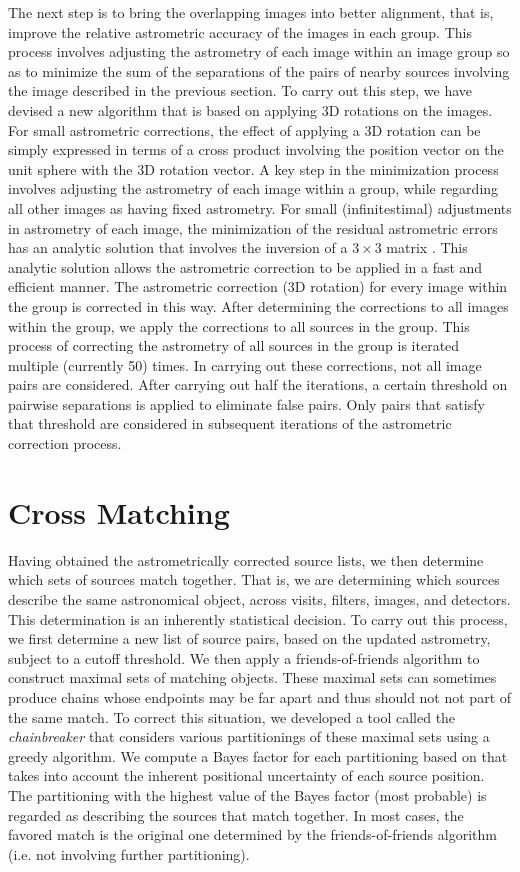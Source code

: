 The next step is to bring the overlapping images into better alignment, that is,
improve the relative astrometric accuracy of the images in each group.
This process involves adjusting the astrometry of each
image within an image group so as to  minimize the sum of the separations of the
pairs of nearby sources involving the image described in the previous section.
To carry out this step, we have devised a new algorithm that is based
on applying 3D rotations on the images. 
For small astrometric corrections,
the effect of applying a 3D rotation can be simply expressed in terms
of a cross product involving the position vector on the unit sphere
with the 3D rotation vector. A key step in the minimization process involves adjusting
the astrometry of
each image within a group, while regarding all other images as having fixed astrometry.
For small (infinitestimal) adjustments in astrometry of each image, the minimization of the residual astrometric errors
has an analytic solution
that involves the inversion of a $3 \times 3$ matrix \citep{2012arXiv1206.0644B}. This analytic solution allows the astrometric correction to be applied
 in a fast and efficient manner. The astrometric correction (3D rotation)
for every image within the group is corrected in this way. After determining the corrections
to all images within the group, we apply the corrections  to all
sources in the group. This process of correcting the astrometry of all sources in the group
is iterated multiple (currently 50) times.
In carrying out these corrections, not all image pairs are considered. After carrying out
half the iterations, a certain threshold on pairwise separations 
is applied
to eliminate false pairs. Only pairs that satisfy that threshold are considered in  subsequent
iterations of the astrometric correction process.

\section{Cross Matching}
Having obtained the astrometrically corrected source lists, we then determine which
sets of sources match together. That is, we are determining which sources describe
the same astronomical object, across visits, filters, images, and detectors. 
This determination is an inherently statistical decision.
To carry out this process, we first determine a new list of source pairs, based on 
the updated astrometry, subject to a cutoff threshold. 
We then apply 
a friends-of-friends algorithm to construct maximal sets of matching objects.
These maximal sets can sometimes produce chains whose endpoints
may be far apart and thus should not not part of the same match. To correct this situation,
we developed a tool called the {\it chainbreaker} that considers various partitionings
of these maximal sets using a greedy algorithm. We
compute a Bayes factor for each partitioning based on \cite{2008ApJ...679..301B} that takes into account
the inherent positional uncertainty of each source position. The partitioning with
the highest value of the Bayes factor (most probable) is regarded as describing the sources
that match together. In most cases, the favored match is the original one determined
by the friends-of-friends algorithm (i.e. not involving further partitioning). 


